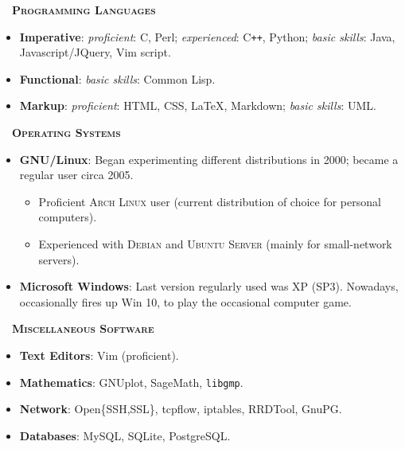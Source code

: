 \documentclass[a4paper,10pt]{extarticle}
\newenvironment{topic}[1]
   {{\noindent\large\bfseries\raisebox{0pt}[\height][1ex]{#1}\hrule\par}%
    \begin{list}{}{%
       \setlength{\leftmargin}{.0cm}}\item[]}
   {\end{list}\medskip}
\begin{document}
\begin{topic}{Technical Skills}
  {\rhd\ \ \bfseries \scshape Programming Languages}  
  \begin{itemize}[leftmargin=*]
    \item{\bfseries Imperative}: \emph{proficient}: C, Perl; \emph{experienced}: C{}\verb!++!, Python;
      \emph{basic skills}: Java, Javascript/JQuery, Vim script.
    \item{\bfseries Functional}: \emph{basic skills}: Common Lisp.
    \item{\bfseries Markup}: \emph{proficient}: HTML, CSS, \LaTeX, Markdown; \emph{basic skills}: UML.
  \end{itemize}
	\newpage %
  {\rhd\ \ \bfseries \scshape Operating Systems} 
  \begin{itemize}[leftmargin=*]
		\item{\bfseries GNU/Linux}: Began experimenting different distributions in 
			2000; became a regular user circa 2005.
      \begin{itemize}
				\item Proficient \textsc{Arch Linux} user (current distribution of choice for personal computers).
				\item Experienced with \textsc{Debian} and \textsc{Ubuntu Server} (mainly for small-network servers).
      \end{itemize}
		\item{\bfseries Microsoft Windows}: Last version regularly used was XP 
			(SP3). Nowadays, occasionally fires up Win 10, to play the occasional 
			computer game.
  \end{itemize}
  {\rhd\ \ \bfseries \scshape Miscellaneous Software}\\[1em]
	\begin{minipage}{0.5\textwidth}
		\begin{itemize}
			\item{\bfseries Text Editors}: Vim (proficient).\\\phantom{xpto}
			\item{\bfseries Mathematics}: GNUplot, SageMath, 
				\texttt{libgmp}.
		\end{itemize}
	\end{minipage}%
	\begin{minipage}{0.5\textwidth}
		\begin{itemize}
			\item{\bfseries Network}: Open\{SSH,SSL\}, tcpflow, iptables, RRDTool, GnuPG.
			\item{\bfseries Databases}: MySQL, SQLite, PostgreSQL.
		\end{itemize}
	\end{minipage}
\end{topic}
\end{document}
